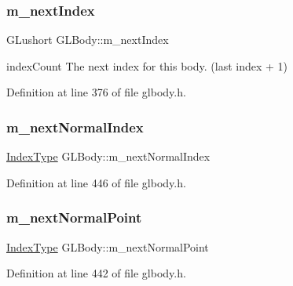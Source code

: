 \mbox{\label{class_g_l_body_a09c31be4c87449e26ec420916e132eac}} 
\subsubsection{\texorpdfstring{m\_nextIndex}{m\_nextIndex}}
{\footnotesize\ttfamily G\+Lushort G\+L\+Body\+::m\+\_\+next\+Index\hspace{0.3cm}{\ttfamily [protected]}}



index\+Count The next index for this body. (last index + 1) 



Definition at line 376 of file glbody.\+h.

\mbox{\label{class_g_l_body_af69d3ddae94f6a09446970f97ded2cc5}} 
\subsubsection{\texorpdfstring{m\_nextNormalIndex}{m\_nextNormalIndex}}
{\footnotesize\ttfamily \mbox{\hyperlink{gldefines_8h_af3c748960f29c42e5b7f1dc449ab66ff}{Index\+Type}} G\+L\+Body\+::m\+\_\+next\+Normal\+Index\hspace{0.3cm}{\ttfamily [protected]}}



Definition at line 446 of file glbody.\+h.

\mbox{\label{class_g_l_body_a43978300a750a5c67e474a576ac3ad3c}} 
\subsubsection{\texorpdfstring{m\_nextNormalPoint}{m\_nextNormalPoint}}
{\footnotesize\ttfamily \mbox{\hyperlink{gldefines_8h_af3c748960f29c42e5b7f1dc449ab66ff}{Index\+Type}} G\+L\+Body\+::m\+\_\+next\+Normal\+Point\hspace{0.3cm}{\ttfamily [protected]}}



Definition at line 442 of file glbody.\+h.

